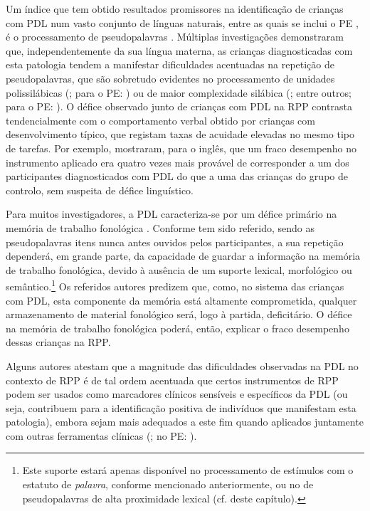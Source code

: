 \documentclass[output=paper,colorlinks,citecolor=brown,booklanguage=portuguese]{langscibook}
\begin{document}
Um índice que tem obtido resultados promissores na identificação de crianças com PDL num vasto conjunto de línguas naturais, entre as quais se inclui o PE \citep{CruzSantos2009, Catarino2019}, é o processamento de pseudopalavras \citep{Coady2008}. Múltiplas investigações demonstraram que, independentemente da sua língua materna, as crianças diagnosticadas com esta patologia tendem a manifestar dificuldades acentuadas na repeti\-ção de pseudopalavras, que são sobretudo evidentes no processamento de unidades polissilábicas (\citealp{Gathercole1990, Gathercole1991, Gathercole1994}; para o PE: \citealp{CruzSantos2009}) ou de maior complexidade silábica (\citealp{Almeida2019, Gallon2007, Marshall2002, Marshall2003}; entre outros; para o PE: \citealp{Catarino2019}). O défice observado junto de crianças com PDL na RPP contrasta tendencialmente com o comportamento verbal obtido por crianças com desenvolvimento típico, que registam taxas de acuidade elevadas no mesmo tipo de tarefas. Por exemplo, \citet[871]{Weismer2000} mostraram, para o inglês, que um fraco desempenho no instrumento aplicado era quatro vezes mais provável de corresponder a um dos participantes diagnosticados com PDL do que a uma das crianças do grupo de controlo, sem suspeita de défice linguístico.

Para muitos investigadores, a PDL caracteriza-se por um défice primário na memó\-ria de trabalho fonológica \citep{Gathercole1990, Gathercole1994, Montgomery1995}. Conforme tem sido referido, sendo as pseudopala\-vras itens nunca antes ouvidos pelos participantes, a sua repetição dependerá, em grande parte, da capacidade de guardar a informação na memória de trabalho fonológica, devido à ausência de um suporte lexical, morfológico ou semântico.\footnote{ Este suporte estará apenas disponível no processamento de estímulos com o estatuto de \emph{palavra}, conforme mencionado anteriormente, ou no de pseudopalavras de alta proximidade lexical (cf.  deste capítulo).} Os referidos autores predizem que, como, no sistema das crianças com PDL, esta componente da memória está altamente comprometida, qualquer armazenamento de material fonológico será, logo à partida, deficitário. O défice na memória de trabalho fonológica poderá, então, explicar o fraco desempenho dessas crianças na RPP.

Alguns autores atestam que a magnitude das dificuldades observadas na PDL no contexto de RPP é de tal ordem acentuada que certos instrumentos de RPP podem ser usados como marcadores clínicos sensíveis e específicos da PDL (ou seja, contribuem para a identificação positiva de indivíduos que manifestam esta patologia), embora sejam mais adequados a este fim quando aplicados juntamente com outras ferramentas clínicas (\citealp{Bishop1996, ContiRamsdem2001, Weismer2000, Estes2007}; no PE: \citealp{CruzSantos2009}).
\end{document}
